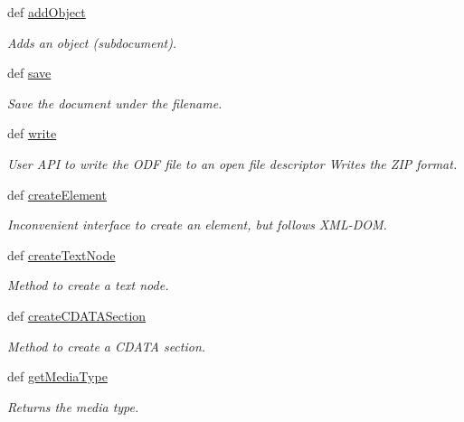 \begin{DoxyCompactItemize}
def \hyperlink{classodf_1_1opendocument_1_1OpenDocument_a144bf0fac4c31966a7c06bda750c5292}{add\+Object}
\begin{DoxyCompactList}\small\item\em Adds an object (subdocument). \end{DoxyCompactList}\item 
def \hyperlink{classodf_1_1opendocument_1_1OpenDocument_a5da82f7bc2ccbdfa109c3d4e9d553156}{save}
\begin{DoxyCompactList}\small\item\em Save the document under the filename. \end{DoxyCompactList}\item 
def \hyperlink{classodf_1_1opendocument_1_1OpenDocument_a5088fc9de8984040fefffbca9fa84577}{write}
\begin{DoxyCompactList}\small\item\em User A\+P\+I to write the O\+D\+F file to an open file descriptor Writes the Z\+I\+P format. \end{DoxyCompactList}\item 
def \hyperlink{classodf_1_1opendocument_1_1OpenDocument_a557ebf9821190cd4cec24b76e43e41f9}{create\+Element}
\begin{DoxyCompactList}\small\item\em Inconvenient interface to create an element, but follows X\+M\+L-\/\+D\+O\+M. \end{DoxyCompactList}\item 
def \hyperlink{classodf_1_1opendocument_1_1OpenDocument_a791929b4a2070b86162f14d945715c63}{create\+Text\+Node}
\begin{DoxyCompactList}\small\item\em Method to create a text node. \end{DoxyCompactList}\item 
def \hyperlink{classodf_1_1opendocument_1_1OpenDocument_a18fdff019249927d02c6604da857672d}{create\+C\+D\+A\+T\+A\+Section}
\begin{DoxyCompactList}\small\item\em Method to create a C\+D\+A\+T\+A section. \end{DoxyCompactList}\item 
def \hyperlink{classodf_1_1opendocument_1_1OpenDocument_ae1d827d4f3b6fa8bb24008b94fc728d6}{get\+Media\+Type}
\begin{DoxyCompactList}\small\item\em Returns the media type. \end{DoxyCompactList}\item 

\end{DoxyCompactItemize}
